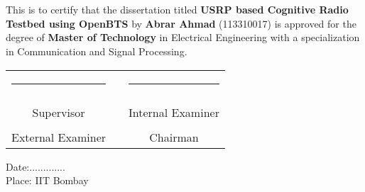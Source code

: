 \chapter*{}

This is to certify that the dissertation titled \textbf{USRP based Cognitive
Radio Testbed using OpenBTS} by \textbf{Abrar Ahmad} (113310017) is approved
for the degree of \textbf{Master of Technology} in Electrical Engineering with
a specialization in Communication and Signal Processing.

\vspace{1.7cm}

\begin{center}
\begin{tabular}{ccc}
\rule{60mm}{0pt}        & \rule{10mm}{0pt}       & \rule{60mm}{0pt} \\
\dotfill                &                        & \dotfill \\
Supervisor              &                        & Internal Examiner \vspace{1.3cm} \\
\dotfill                &                        & \dotfill \\
External Examiner       &                        & Chairman \vspace{1.3cm} \\
\end{tabular}    
\end{center}

\vspace{1cm}

Date:............. \\
Place: IIT Bombay
